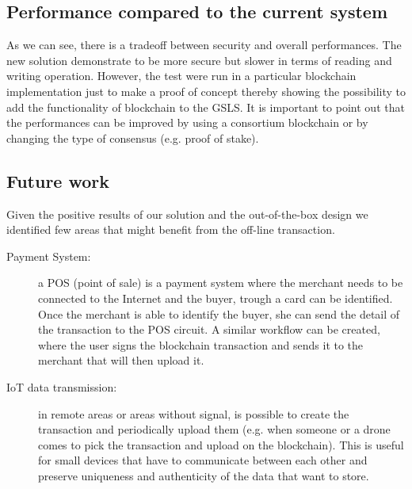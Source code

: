 \subsection{Performance compared to the current system}

As we can see, there is a tradeoff between security and overall performances. The new solution demonstrate to be more secure but slower in terms of reading and writing operation. However, the test were run in a particular blockchain implementation just to make a proof of concept thereby showing the possibility to add the functionality of blockchain to the GSLS. It is important to point out that the performances can be improved by using a consortium blockchain or by changing the type of consensus (e.g. proof of stake).

\subsection{Future work}

Given the positive results of our solution and the out-of-the-box design we identified few areas that might benefit from the off-line transaction.

\begin{description}
    
    \item[Payment System:] a POS (point of sale) is a payment system where the merchant needs to be connected to the Internet and the buyer, trough a card can be identified. Once the merchant is able to identify the buyer, she can send the detail of the transaction to the POS circuit.
    A similar workflow can be created, where the user signs the blockchain transaction and sends it to the merchant that will then upload it.

    \item[IoT data transmission:] in remote areas or areas without signal, is possible to create the transaction and periodically upload them (e.g. when someone or a drone comes to pick the transaction and upload on the blockchain). This is useful for small devices that have to communicate between each other and preserve uniqueness and authenticity of the data that want to store.
    
\end{description}
